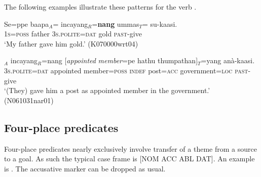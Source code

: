 \documentclass[a4paper,10pt]{article}
\begin{document}
The following examples illustrate these patterns for the verb .

\ea 
\gll Se=ppe    baapa$_{A}$=\zero{}  incayang$_{R}$=\textbf{nang}    ummas$_{T}$=\zero{} su-kaasi. \\
      \textsc{1s}=\textsc{poss} father \textsc{3s.polite}=\textsc{dat} gold \textsc{past}-give\\
    `My father gave him gold.'  (K070000wrt04)
\z   

\ea
\gll  \zero$_{A}$ incayang$_{R}$=nang    [{\em appointed} {\em member}=pe     hathu  thumpathan]$_{T}$=yang   anà-kaasi. \\
      { } \textsc{3s.polite}=\textsc{dat} appointed member=\textsc{poss} \textsc{indef} post=\textsc{acc} government=\textsc{loc} \textsc{past}-give \\
    `(They) gave him a post as appointed member in the government.' (N061031nar01)
\z
 




\subsection{Four-place predicates}
Four-place predicates nearly exclusively involve transfer of a theme from a source to a goal. As such the typical case frame is [NOM ACC ABL DAT]. An example is . The accusative marker can be dropped as usual.
\end{document}
